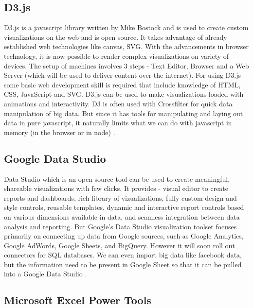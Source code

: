 \subsection*{D3.js}

D3.js is a javascript library written by Mike Bostock and is used to create custom visualizations on the web and is open source. It takes advantage of already established web technologies like canvas, SVG. With the advancements in browser technology, it is now possible to render complex visualizations on variety of devices. The setup of machines involves 3 steps - Text Editor, Browser and a Web Server (which will be used to deliver content over the internet). For using D3.js some basic web development skill is required that include knowledge of HTML, CSS, JavaScript and SVG.
D3.js can be used to make visualizations loaded with animations and interactivity. D3 is often used with Crossfilter for quick data manipulation of big data. But since it has tools for manipulating and laying out data in pure javascript, it naturally limits what we can do with javascript in memory (in the browser or in node) \cite{D3}.\\


\subsection*{Google Data Studio}

Data Studio which is an open source tool can be used to create meaningful, shareable visualizations with few clicks. It provides - visual editor to create reports and dashboards, rich library of vizualizations, fully custom design and style controls, reusable templates, dynamic and interactive report controls based on various dimensions available in data, and seamless integration between data analysis and reporting. But Google's Data Studio visualization toolset focuses primarily on connecting up data from Google sources, such as Google Analytics, Google AdWords, Google Sheets, and BigQuery. However it will soon roll out connectors for SQL databases. We can even import big data like facebook data, but the information need to be present in Google Sheet so that it can be pulled into a Google Data Studio \cite{Google}. \\

\subsection*{Microsoft Excel Power Tools}

